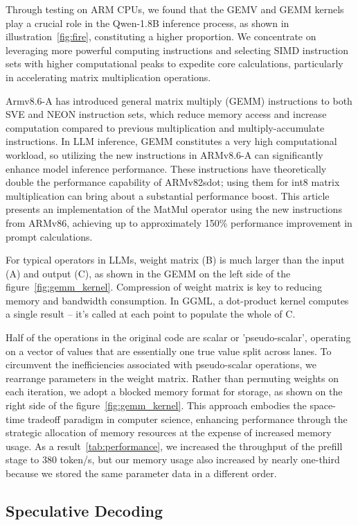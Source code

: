 \documentclass[conference]{IEEEtran}
\begin{document}
Through testing on ARM CPUs, we found that the GEMV and GEMM kernels play a crucial role in the Qwen-1.8B inference process, as shown in illustration~\ref{fig:fire}, constituting a higher proportion. We concentrate on leveraging more powerful computing instructions and selecting SIMD instruction sets with higher computational peaks to expedite core calculations, particularly in accelerating matrix multiplication operations.

Armv8.6-A has introduced general matrix multiply (GEMM) instructions to both SVE and NEON instruction sets, which reduce memory access and increase computation compared to previous multiplication and multiply-accumulate instructions. In LLM inference, GEMM constitutes a very high computational workload, so utilizing the new instructions in ARMv8.6-A can significantly enhance model inference performance. These instructions have theoretically double the performance capability of ARMv82sdot; using them for int8 matrix multiplication can bring about a substantial performance boost. This article presents an implementation of the MatMul operator using the new instructions from ARMv86, achieving up to approximately 150\% performance improvement in prompt calculations. 

For typical operators in LLMs, weight matrix (B) is much larger than the input (A) and output (C), as shown in the GEMM on the left side of the figure~\ref{fig:gemm_kernel}. Compression of weight matrix is key to reducing memory and bandwidth consumption. In GGML, a dot-product kernel computes a single result – it’s called at each point to populate the whole of C.

Half of the operations in the original code are scalar or 'pseudo-scalar', operating on a vector of values that are essentially one true value split across lanes. To circumvent the inefficiencies associated with pseudo-scalar operations, we rearrange parameters in the weight matrix. Rather than permuting weights on each iteration, we adopt a blocked memory format for storage, as shown  on the right side of the figure~\ref{fig:gemm_kernel}. This approach embodies the space-time tradeoff paradigm in computer science, enhancing performance through the strategic allocation of memory resources at the expense of increased memory usage. As a result~\ref{tab:performance}, we increased the throughput of the prefill stage to 380 token/s, but our memory usage also increased by nearly one-third because we stored the same parameter data in a different order.


\subsection{Speculative Decoding}\label{DD}
\end{document}
